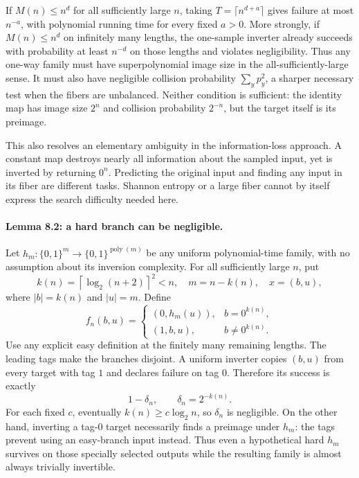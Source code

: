 \documentclass[11pt]{article}
\begin{document}
If $M(n)\le n^d$ for all sufficiently large $n$, taking
$T=\lceil n^{d+a}\rceil$ gives failure at most $n^{-a}$, with polynomial
running time for every fixed $a>0$. More strongly, if $M(n)\le n^d$ on
infinitely many lengths, the one-sample inverter already succeeds with
probability at least $n^{-d}$ on those lengths and violates negligibility.
Thus any one-way family must have superpolynomial image size in the
all-sufficiently-large sense. It must also have negligible collision
probability $\sum_y p_y^2$, a sharper necessary test when the fibers are
unbalanced. Neither condition is sufficient: the identity map has image size
$2^n$ and collision probability $2^{-n}$, but the target itself is its
preimage.

This also resolves an elementary ambiguity in the information-loss approach.
A constant map destroys nearly all information about the sampled input, yet
is inverted by returning $0^n$. Predicting the original input and finding any
input in its fiber are different tasks. Shannon entropy or a large fiber
cannot by itself express the search difficulty needed here.

\paragraph{Lemma 8.2: a hard branch can be negligible.}
Let $h_m:\{0,1\}^m\to\{0,1\}^{\operatorname{poly}(m)}$ be any uniform
polynomial-time family, with no assumption about its inversion complexity.
For all sufficiently large $n$, put
\[
 k(n)=\left\lceil\log_2(n+2)\right\rceil^2<n,
 \quad m=n-k(n),\quad x=(b,u),
\]
where $|b|=k(n)$ and $|u|=m$. Define
\begin{equation}\label{a8:branch}
 f_n(b,u)=
 \begin{cases}
 (0,h_m(u)),&b=0^{k(n)},\\
 (1,b,u),&b\ne0^{k(n)}.
 \end{cases}
\end{equation}
Use any explicit easy definition at the finitely many remaining lengths.
The leading tags make the branches disjoint. A uniform inverter copies
$(b,u)$ from every target with tag $1$ and declares failure on tag $0$.
Therefore its success is exactly
\[
                    1-\delta_n,\qquad\delta_n=2^{-k(n)}.
\]
For each fixed $c$, eventually $k(n)\ge c\log_2 n$, so $\delta_n$ is
negligible. On the other hand, inverting a tag-$0$ target necessarily finds a
preimage under $h_m$: the tags prevent using an easy-branch input instead.
Thus even a hypothetical hard $h_m$ survives on those specially selected
outputs while the resulting family is almost always trivially invertible.
\end{document}
